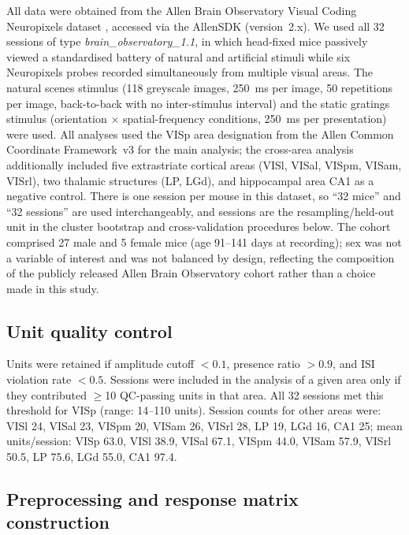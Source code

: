 \documentclass[11pt,onecolumn]{article}
\begin{document}
All data were obtained from the Allen Brain Observatory Visual Coding
Neuropixels dataset \citep{siegle2021}, accessed via the AllenSDK
(version~2.x). We used all 32 sessions of type
\textit{brain\_observatory\_1.1}, in which head-fixed mice passively
viewed a standardised battery of natural and artificial stimuli while six
Neuropixels probes recorded simultaneously from multiple visual areas.
The natural scenes stimulus (118 greyscale images, 250~ms per image, 50
repetitions per image, back-to-back with no inter-stimulus interval) and
the static gratings stimulus (orientation $\times$ spatial-frequency
conditions, 250~ms per presentation) were used. All analyses used the
VISp area designation from the Allen Common Coordinate Framework~v3 for
the main analysis; the cross-area analysis additionally included five
extrastriate cortical areas (VISl, VISal, VISpm, VISam, VISrl), two
thalamic structures (LP, LGd), and hippocampal area CA1 as a negative
control. There is one session per mouse in this dataset,
so ``32 mice'' and ``32 sessions'' are used interchangeably, and sessions
are the resampling/held-out unit in the cluster bootstrap and
cross-validation procedures below. The cohort comprised 27 male and 5
female mice (age 91--141 days at recording); sex was not a variable of
interest and was not balanced by design, reflecting the composition of
the publicly released Allen Brain Observatory cohort rather than a choice
made in this study.

\subsection{Unit quality control}
\label{Methods:QC}

Units were retained if amplitude cutoff $< 0.1$, presence ratio $> 0.9$,
and ISI violation rate $< 0.5$. Sessions were included in the analysis of
a given area only if they contributed $\geq$10 QC-passing units in that
area. All 32 sessions met this threshold for VISp (range: 14--110 units).
Session counts for other areas were: VISl 24, VISal 23, VISpm 20,
VISam 26, VISrl 28, LP 19, LGd 16, CA1 25; mean units/session: VISp
63.0, VISl 38.9, VISal 67.1, VISpm 44.0, VISam 57.9, VISrl 50.5, LP
75.6, LGd 55.0, CA1 97.4.

\subsection{Preprocessing and response matrix construction}
\label{Methods:Preprocessing}
\end{document}
